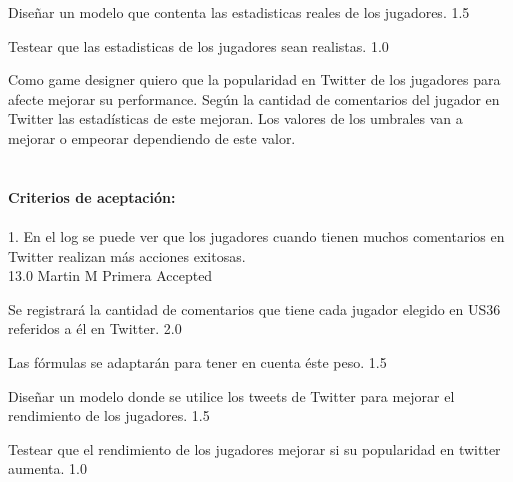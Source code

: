 		{Diseñar un modelo que contenta las estadisticas reales de los jugadores.} %
		{} %
		{1.5} %
		{} %
		{} %
		{} %

		{Testear que las estadisticas de los jugadores sean realistas.} %
		{} %
		{1.0} %
		{} %
		{} %
		{} %

\vspace{20pt}

	{Como game designer quiero que la popularidad en Twitter de los jugadores para afecte mejorar su performance.} %
	{Según la cantidad de comentarios del jugador en Twitter las estadísticas de este mejoran. Los valores de los umbrales van a mejorar o empeorar dependiendo de este valor. \\
  \\
  \\
\textbf{Criterios de aceptación:}\\
  \\
1. En el log se puede ver que los jugadores cuando tienen muchos comentarios en Twitter realizan más acciones exitosas. \\
} %
	{} %
	{13.0} %
	{Martin M} %
	{Primera} %
	{Accepted} %

		{Se registrará la cantidad de comentarios que tiene cada jugador elegido en US36 referidos a él en Twitter.} %
		{} %
		{2.0} %
		{} %
		{} %
		{} %

		{Las fórmulas se adaptarán para tener en cuenta éste peso.} %
		{} %
		{1.5} %
		{} %
		{} %
		{} %

		{Diseñar un modelo donde se utilice los tweets de Twitter para mejorar el rendimiento de los jugadores.} %
		{} %
		{1.5} %
		{} %
		{} %
		{} %


		{Testear que el rendimiento de los jugadores mejorar si su popularidad en twitter aumenta.} %
		{} %
		{1.0} %
		{} %
		{} %
		{} %

\vspace{20pt}




